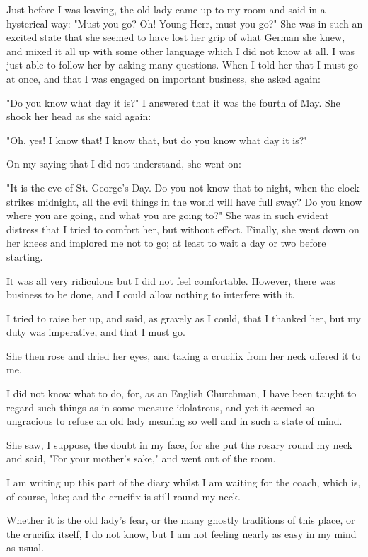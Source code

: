 Just before I was leaving, the old lady came up to my room and said in a hysterical way: "Must you go? Oh! Young Herr, must you go?" She was in such an excited state that she seemed to have lost her grip of what German she knew, and mixed it all up with some other language which I did not know at all. I was just able to follow her by asking many questions. When I told her that I must go at once, and that I was engaged on important business, she asked again:

"Do you know what day it is?" I answered that it was the fourth of May. She shook her head as she said again:

"Oh, yes! I know that! I know that, but do you know what day it is?"

On my saying that I did not understand, she went on:

"It is the eve of St. George's Day. Do you not know that to-night, when the clock strikes midnight, all the evil things in the world will have full sway? Do you know where you are going, and what you are going to?" She was in such evident distress that I tried to comfort her, but without effect. Finally, she went down on her knees and implored me not to go; at least to wait a day or two before starting.

It was all very ridiculous but I did not feel comfortable. However, there was business to be done, and I could allow nothing to interfere with it.

I tried to raise her up, and said, as gravely as I could, that I thanked her, but my duty was imperative, and that I must go.

She then rose and dried her eyes, and taking a crucifix from her neck offered it to me.

I did not know what to do, for, as an English Churchman, I have been taught to regard such things as in some measure idolatrous, and yet it seemed so ungracious to refuse an old lady meaning so well and in such a state of mind.

She saw, I suppose, the doubt in my face, for she put the rosary round my neck and said, "For your mother's sake," and went out of the room.

I am writing up this part of the diary whilst I am waiting for the coach, which is, of course, late; and the crucifix is still round my neck.

Whether it is the old lady's fear, or the many ghostly traditions of this place, or the crucifix itself, I do not know, but I am not feeling nearly as easy in my mind as usual.

